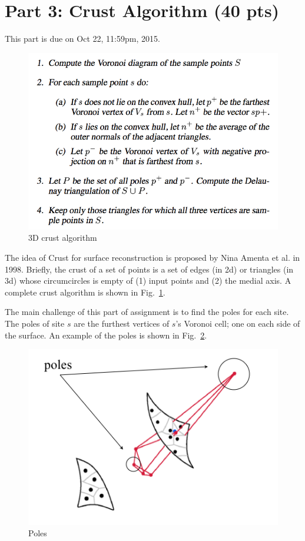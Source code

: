 \documentclass[11pt]{article}
\begin{document}
\section{Part 3: Crust Algorithm (40 pts)}

This part is due on Oct 22, 11:59pm, 2015.


\begin{figure}[ht]
\centering
\includegraphics[width=.5\textwidth]{FIGS/crust-alg}
\caption{3D crust algorithm}
\label{alg:crust-alg}
\end{figure}

The idea of Crust for surface reconstruction is proposed by Nina Amenta et al. \cite{abk-anvra-98} in 1998.
Briefly, the crust of a set of points is a set of edges (in 2d) or triangles (in 3d) whose circumcircles is empty of
(1) input points and (2) the medial axis.  A complete crust algorithm is shown in Fig.~\ref{alg:crust-alg}.


The main challenge of this part of assignment is to find the poles for each site. The poles
of site $s$ are the furthest vertices of $s$'s Voronoi cell; one on each side of the surface. 
An example of the poles is shown in Fig.~\ref{fig:crust-pole}.


\begin{figure}[ht]
\centering
\begin{minipage}[t]{0.5\linewidth}
\includegraphics[width=\textwidth]{FIGS/crust-pole}
\caption{Poles}
\label{fig:crust-pole}
\end{minipage}
\end{figure}
\end{document}
